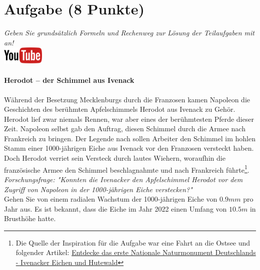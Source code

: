 \documentclass[a4paper, 9pt]{scrartcl}\usepackage[]{graphicx}\usepackage[]{xcolor}
\begin{document}
\section{Aufgabe \hfill (8 Punkte)}

\textit{Geben Sie grunds{\"a}tzlich Formeln und Rechenweg zur L{\"o}sung der
  Teilaufgaben mit an!} \\[1Ex]

\hfill\href{https://youtu.be/Fu8kN0Uj13Y}{\includegraphics[width =
  2cm]{img/youtube}} %
\hspace{2Ex}

\paragraph{Herodot – der Schimmel aus Ivenack}

W{\"a}hrend der Besetzung Mecklenburgs durch die Franzosen kamen Napoleon die
Geschichten des ber{\"u}hmten Apfelschimmels Herodot aus Ivenack zu
Geh{\"o}r. Herodot lief zwar niemals Rennen, war aber eines der ber{\"u}hmtesten
Pferde dieser Zeit. Napoleon selbst gab den Auftrag, diesen
Schimmel durch die Armee nach Frankreich zu bringen. Der Legende nach
sollen Arbeiter den Schimmel im hohlen Stamm einer 1000-j{\"a}hrigen Eiche aus Ivenack vor
den Franzosen versteckt haben. Doch Herodot verriet sein Versteck durch
lautes Wiehern, woraufhin die franz{\"o}sische Armee den Schimmel
beschlagnahmte und nach Frankreich f{\"u}hrte\footnote{Die Quelle der Inspiration
  für die Aufgabe war eine Fahrt an die Ostsee und folgender Artikel:
  \href{https://www.wald-mv.de/landingpage/ivenacker-eichen/}{Entdecke das erste Nationale Naturmonument Deutschlands - Ivenacker Eichen und Hutewald}}. \\



\textit{Forschungsfrage: "Konnten die Ivenacker den Apfelschimmel Herodot
  vor dem Zugriff von Napoleon in der 1000-j{\"a}hrigen Eiche verstecken?"} \\

Gehen Sie von einem radialen Wachstum der 1000-j{\"a}hrigen Eiche von
$0.9mm$ pro Jahr aus. Es ist bekannt, dass die Eiche im
Jahr 2022 einen Umfang von $10.5m$ in Brusth{\"o}he hatte.
\end{document}
